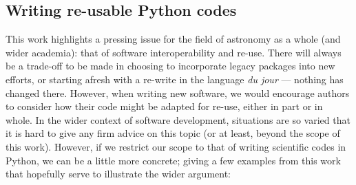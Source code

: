 \documentclass[5p,authoryear]{elsarticle}
\begin{document}
\subsection{Writing re-usable Python codes}
\label{sec:code-reuse}
This work highlights a pressing issue for the field of astronomy as a whole (and wider academia): that of software interoperability and re-use. 
There will always be a trade-off to be made in choosing to incorporate legacy packages into new efforts, or starting afresh with a re-write in the language \textit{du jour} --- nothing has changed there. 
However, when writing new software, we would encourage authors to consider how their code might be adapted for re-use, either in part or in whole. 
In the wider context of software development, situations are so varied that it is hard to give any firm advice on this topic (or at least,  beyond the scope of this work). 
However, if we restrict our scope to that of writing scientific codes in Python, we can be a little more concrete; giving a few examples from this work that hopefully serve to illustrate the wider argument:
\end{document}

